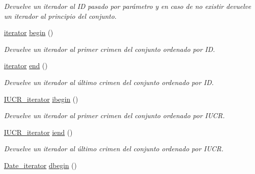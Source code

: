 \begin{DoxyCompactItemize}
\begin{DoxyCompactList}\small\item\em Devuelve un iterador al I\+D pasado por parámetro y en caso de no existir devuelve un iterador al principio del conjunto. \end{DoxyCompactList}\item 
\hypertarget{classCSS_a8da54a9e8f5e9090f840361e5e656a59}{}\hyperlink{classCSS_1_1iterator}{iterator} \hyperlink{classCSS_a8da54a9e8f5e9090f840361e5e656a59}{begin} ()\label{classCSS_a8da54a9e8f5e9090f840361e5e656a59}

\begin{DoxyCompactList}\small\item\em Devuelve un iterador al primer crimen del conjunto ordenado por I\+D. \end{DoxyCompactList}\item 
\hypertarget{classCSS_ac5d8965f7509862d34b07f9a29e8f10d}{}\hyperlink{classCSS_1_1iterator}{iterator} \hyperlink{classCSS_ac5d8965f7509862d34b07f9a29e8f10d}{end} ()\label{classCSS_ac5d8965f7509862d34b07f9a29e8f10d}

\begin{DoxyCompactList}\small\item\em Devuelve un iterador al último crimen del conjunto ordenado por I\+D. \end{DoxyCompactList}\item 
\hypertarget{classCSS_aff5661f866d36d588f8892d3089d8c11}{}\hyperlink{classCSS_1_1IUCR__iterator}{I\+U\+C\+R\+\_\+iterator} \hyperlink{classCSS_aff5661f866d36d588f8892d3089d8c11}{ibegin} ()\label{classCSS_aff5661f866d36d588f8892d3089d8c11}

\begin{DoxyCompactList}\small\item\em Devuelve un iterador al primer crimen del conjunto ordenado por I\+U\+C\+R. \end{DoxyCompactList}\item 
\hypertarget{classCSS_a739c71c2391a794544612d2368e3a010}{}\hyperlink{classCSS_1_1IUCR__iterator}{I\+U\+C\+R\+\_\+iterator} \hyperlink{classCSS_a739c71c2391a794544612d2368e3a010}{iend} ()\label{classCSS_a739c71c2391a794544612d2368e3a010}

\begin{DoxyCompactList}\small\item\em Devuelve un iterador al último crimen del conjunto ordenado por I\+U\+C\+R. \end{DoxyCompactList}\item 
\hypertarget{classCSS_a2d05eb08f299f53aba2273cf90876f01}{}\hyperlink{classCSS_1_1Date__iterator}{Date\+\_\+iterator} \hyperlink{classCSS_a2d05eb08f299f53aba2273cf90876f01}{dbegin} ()\label{classCSS_a2d05eb08f299f53aba2273cf90876f01}


\end{DoxyCompactItemize}
